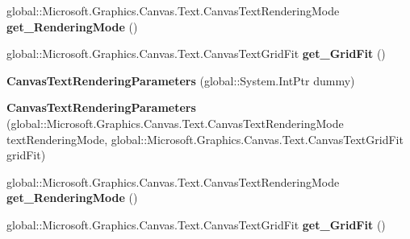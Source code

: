 \begin{DoxyCompactItemize}
\item 
\mbox{\label{class_microsoft_1_1_graphics_1_1_canvas_1_1_text_1_1_canvas_text_rendering_parameters_ac81e7f0df5d66bcb7ea9834f1b82dbfe}} 
global\+::\+Microsoft.\+Graphics.\+Canvas.\+Text.\+Canvas\+Text\+Rendering\+Mode {\bfseries get\+\_\+\+Rendering\+Mode} ()
\item 
\mbox{\label{class_microsoft_1_1_graphics_1_1_canvas_1_1_text_1_1_canvas_text_rendering_parameters_aa1458117209938acb439e48a1b9840d1}} 
global\+::\+Microsoft.\+Graphics.\+Canvas.\+Text.\+Canvas\+Text\+Grid\+Fit {\bfseries get\+\_\+\+Grid\+Fit} ()
\item 
\mbox{\label{class_microsoft_1_1_graphics_1_1_canvas_1_1_text_1_1_canvas_text_rendering_parameters_a808dd2cd44ae8871c788d0f285abb379}} 
{\bfseries Canvas\+Text\+Rendering\+Parameters} (global\+::\+System.\+Int\+Ptr dummy)
\item 
\mbox{\label{class_microsoft_1_1_graphics_1_1_canvas_1_1_text_1_1_canvas_text_rendering_parameters_a8bc601f6cb5eb616c046828f90971b95}} 
{\bfseries Canvas\+Text\+Rendering\+Parameters} (global\+::\+Microsoft.\+Graphics.\+Canvas.\+Text.\+Canvas\+Text\+Rendering\+Mode text\+Rendering\+Mode, global\+::\+Microsoft.\+Graphics.\+Canvas.\+Text.\+Canvas\+Text\+Grid\+Fit grid\+Fit)
\item 
\mbox{\label{class_microsoft_1_1_graphics_1_1_canvas_1_1_text_1_1_canvas_text_rendering_parameters_ac81e7f0df5d66bcb7ea9834f1b82dbfe}} 
global\+::\+Microsoft.\+Graphics.\+Canvas.\+Text.\+Canvas\+Text\+Rendering\+Mode {\bfseries get\+\_\+\+Rendering\+Mode} ()
\item 
\mbox{\label{class_microsoft_1_1_graphics_1_1_canvas_1_1_text_1_1_canvas_text_rendering_parameters_aa1458117209938acb439e48a1b9840d1}} 
global\+::\+Microsoft.\+Graphics.\+Canvas.\+Text.\+Canvas\+Text\+Grid\+Fit {\bfseries get\+\_\+\+Grid\+Fit} ()

\end{DoxyCompactItemize}
